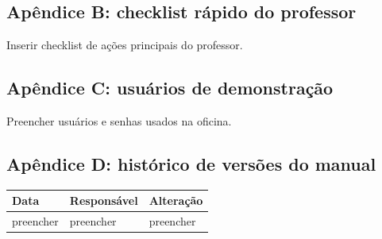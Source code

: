 \documentclass[12pt,a4paper]{article}
\begin{document}
\subsection{Apêndice B: checklist rápido do professor}
Inserir checklist de ações principais do professor.

\subsection{Apêndice C: usuários de demonstração}
Preencher usuários e senhas usados na oficina.

\subsection{Apêndice D: histórico de versões do manual}

\begin{longtable}{|p{3cm}|p{4cm}|p{7cm}|}
\hline
\textbf{Data} & \textbf{Responsável} & \textbf{Alteração} \\
\hline
preencher & preencher & preencher \\
\hline
\end{longtable}
\end{document}
